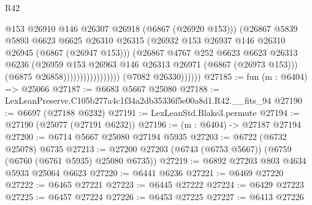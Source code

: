 \begin{lexlean}{R42}
\begin{coremodule}
{                                            @153
                                            @26910
                                            @146
                                            @26307
                                            @26918
                                            (@6867 (@26920 @153)))
                                          (@26867
                                            @5839
                                            @5893
                                            @6623
                                            @6625
                                            @26310
                                            @26315
                                            (@26932
                                              @153
                                              @26937
                                              @146
                                              @26310
                                              @26945
                                              (@6867 (@26947 @153)))
                                            (@26867
                                              @4767
                                              @252
                                              @6623
                                              @6623
                                              @26313
                                              @6236
                                              (@26959
                                                @153
                                                @26963
                                                @146
                                                @26313
                                                @26971
                                                (@6867 (@26973 @153)))
                                              (@6875 @26858)))))))))))))))))
              (@7082 @26330))))))
@27185 := fun (m : @6404) => @25066
@27187 := @6683 @5667 @25080
@27188 := LexLeanPreserve.C105b277a4c1f34a2db35336f5e00a8d1.R42.__fits_94
@27190 := @6697 (@27188 @6232)
@27191 := LexLeanStd.Blake3.permute
@27194 := @27190 (@25077 (@27191 @6232))
@27196 := (m : @6404) -> @27187 @27194
@27200 := @6714 @5667 @25080 @27194 @5935
@27203 := @6722 (@6732 @25078) @6735
@27213 := @27200 @27203 (@6743 (@6753 @5667)) (@6759 (@6760 (@6761 @5935) @25080 @6735))
@27219 := @6892 @27203 @803 @4634 @5933 @25064 @6623
@27220 := @6441 @6236
@27221 := @6469 @27220
@27222 := @6465 @27221
@27223 := @6445 @27222
@27224 := @6429 @27223
@27225 := @6457 @27224
@27226 := @6453 @27225
@27227 := @6413 @27226
}
\end{coremodule}
\end{lexlean}
